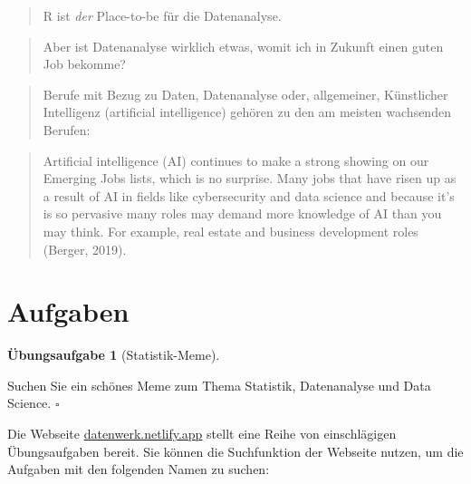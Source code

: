 \documentclass[
  a4paper,
]{scrbook}
\theoremstyle{definition}
\theoremstyle{definition}
\theoremstyle{definition}
\newtheorem{exercise}{Übungsaufgabe}[chapter]
\theoremstyle{remark}
\begin{document}
\begin{quote}
{} R ist \emph{der} Place-to-be für die
Datenanalyse.
\end{quote}

\begin{quote}
{} Aber ist Datenanalyse wirklich etwas, womit ich in
Zukunft einen guten Job bekomme?
\end{quote}

\begin{quote}
{} Berufe mit Bezug zu Daten, Datenanalyse oder,
allgemeiner, Künstlicher Intelligenz (artificial intelligence) gehören
zu den am meisten wachsenden Berufen:
\end{quote}

\begin{quote}
Artificial intelligence (AI) continues to make a strong showing on our
Emerging Jobs lists, which is no surprise. Many jobs that have risen up
as a result of AI in ﬁelds like cybersecurity and data science and
because it's is so pervasive many roles may demand more knowledge of AI
than you may think. For example, real estate and business development
roles (Berger, 2019).
\end{quote}

\section{Aufgaben}\label{aufgaben-1}

\begin{exercise}[Statistik-Meme]\protect\hypertarget{exr-meme}{}\label{exr-meme}

Suchen Sie ein schönes Meme zum Thema Statistik, Datenanalyse und Data
Science. \(\square\)

\end{exercise}

Die Webseite \href{https://datenwerk.netlify.app}{datenwerk.netlify.app}
stellt eine Reihe von einschlägigen Übungsaufgaben bereit. Sie können
die Suchfunktion der Webseite nutzen, um die Aufgaben mit den folgenden
Namen zu suchen:
\end{document}
